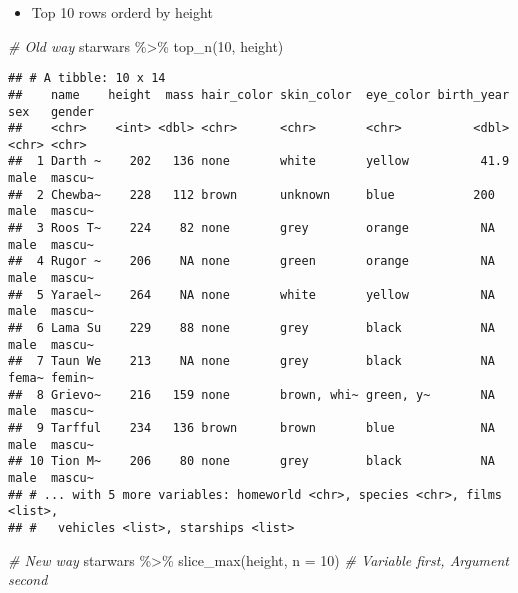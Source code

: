 \documentclass[
]{book}
\newenvironment{Shaded}{\begin{snugshade}}{\end{snugshade}}
\newcommand{\AttributeTok}[1]{\textcolor[rgb]{0.77,0.63,0.00}{#1}}
\newcommand{\CommentTok}[1]{\textcolor[rgb]{0.56,0.35,0.01}{\textit{#1}}}
\newcommand{\DecValTok}[1]{\textcolor[rgb]{0.00,0.00,0.81}{#1}}
\newcommand{\FunctionTok}[1]{\textcolor[rgb]{0.00,0.00,0.00}{#1}}
\newcommand{\NormalTok}[1]{#1}
\newcommand{\SpecialCharTok}[1]{\textcolor[rgb]{0.00,0.00,0.00}{#1}}
\providecommand{\tightlist}{%
  \setlength{\itemsep}{0pt}\setlength{\parskip}{0pt}}
\begin{document}
\begin{itemize}
\tightlist
\item
  Top 10 rows orderd by height
\end{itemize}

\begin{Shaded}
\begin{Highlighting}[]
\CommentTok{\# Old way}
\NormalTok{starwars }\SpecialCharTok{\%\textgreater{}\%}
  \FunctionTok{top\_n}\NormalTok{(}\DecValTok{10}\NormalTok{, height)}
\end{Highlighting}
\end{Shaded}

\begin{verbatim}
## # A tibble: 10 x 14
##    name    height  mass hair_color skin_color  eye_color birth_year sex   gender
##    <chr>    <int> <dbl> <chr>      <chr>       <chr>          <dbl> <chr> <chr> 
##  1 Darth ~    202   136 none       white       yellow          41.9 male  mascu~
##  2 Chewba~    228   112 brown      unknown     blue           200   male  mascu~
##  3 Roos T~    224    82 none       grey        orange          NA   male  mascu~
##  4 Rugor ~    206    NA none       green       orange          NA   male  mascu~
##  5 Yarael~    264    NA none       white       yellow          NA   male  mascu~
##  6 Lama Su    229    88 none       grey        black           NA   male  mascu~
##  7 Taun We    213    NA none       grey        black           NA   fema~ femin~
##  8 Grievo~    216   159 none       brown, whi~ green, y~       NA   male  mascu~
##  9 Tarfful    234   136 brown      brown       blue            NA   male  mascu~
## 10 Tion M~    206    80 none       grey        black           NA   male  mascu~
## # ... with 5 more variables: homeworld <chr>, species <chr>, films <list>,
## #   vehicles <list>, starships <list>
\end{verbatim}

\begin{Shaded}
\begin{Highlighting}[]
\CommentTok{\# New way}
\NormalTok{starwars }\SpecialCharTok{\%\textgreater{}\%}
  \FunctionTok{slice\_max}\NormalTok{(height, }\AttributeTok{n =} \DecValTok{10}\NormalTok{) }\CommentTok{\# Variable first, Argument second}
\end{Highlighting}
\end{Shaded}
\end{document}
